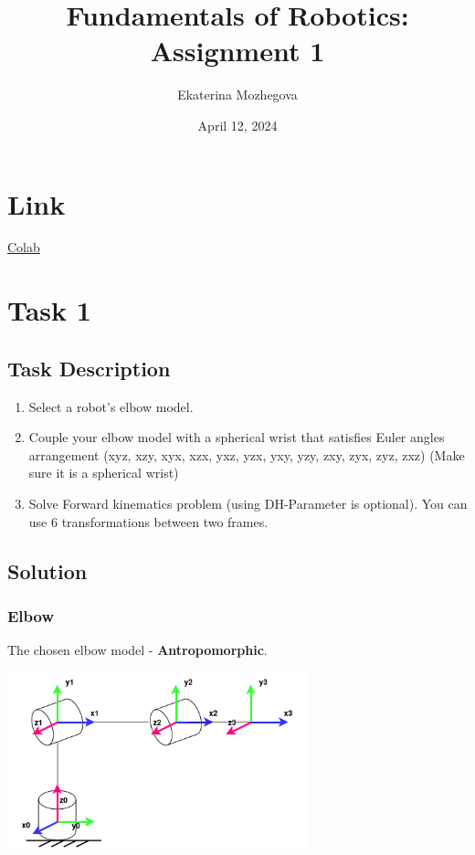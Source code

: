\documentclass{article}
\title{Fundamentals of Robotics: Assignment 1}
\author{Ekaterina Mozhegova}
\date{April 12, 2024}
\begin{document}
\maketitle

\section{Link}

\href{https://colab.research.google.com/drive/170z2YVaeu9kHEuC4bXIWQqJ82eWDJoS2?usp=sharing}{Colab}

\section{Task 1}

\subsection{Task Description}

\begin{enumerate}
    \item Select a robot's elbow model. 
    \item Couple your elbow model with a spherical wrist that satisfies Euler angles arrangement (xyz, xzy,
xyx, xzx, yxz, yzx, yxy, yzy, zxy, zyx, zyz, zxz) (Make sure it is a spherical wrist)
    \item Solve Forward kinematics problem (using DH-Parameter is optional). You can use 6
transformations between two frames.
\end{enumerate}


\subsection{Solution}

\subsubsection{Elbow}

The chosen elbow model - \textbf{Antropomorphic}.
\begin{center}
    \includegraphics*[width=0.65\textwidth]{images/new_elbow.png}
\end{center}
\end{document}
